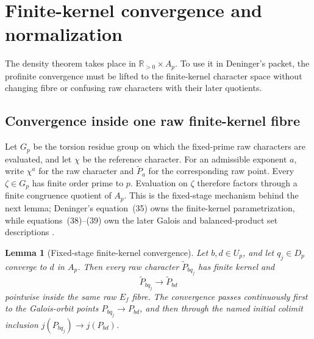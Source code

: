 \documentclass[11pt]{article}
\newtheorem{lemma}[theorem]{Lemma}
\theoremstyle{definition}
\newcommand{\R}{\mathbb{R}}
\begin{document}
\section{Finite-kernel convergence and normalization}\label{sec:finite}

The density theorem takes place in \(\R_{>0}\times A_p\).  To use it in Deninger's packet, the profinite convergence must be lifted to the finite-kernel character space without changing fibre or confusing raw characters with their later quotients.

\subsection{Convergence inside one raw finite-kernel fibre}

Let \(G_p\) be the torsion residue group on which the fixed-prime raw characters are evaluated, and let \(\chi\) be the reference character.  For an admissible exponent \(a\), write \(\chi^a\) for the raw character and \(\widetilde P_a\) for the corresponding raw point.  Every \(\zeta\in G_p\) has finite order prime to \(p\).  Evaluation on \(\zeta\) therefore factors through a finite congruence quotient of \(A_p\).  This is the fixed-stage mechanism behind the next lemma; Deninger's equation~(35) owns the finite-kernel parametrization, while equations~(38)--(39) own the later Galois and balanced-product set descriptions \cite[physical pp.~32--33, equations~(35), (38), and~(39)]{Deninger2026}.

\begin{lemma}[Fixed-stage finite-kernel convergence]\label{lem:character}
Let \(b,d\in U_p\), and let \(q_j\in D_p\) converge to \(d\) in \(A_p\).  Then every raw character \(\widetilde P_{bq_j}\) has finite kernel and
\[
 \widetilde P_{bq_j}\longrightarrow\widetilde P_{bd}
\]
pointwise inside the same raw \(E_f\) fibre.  The convergence passes continuously first to the Galois-orbit points \(P_{bq_j}\to P_{bd}\), and then through the named initial colimit inclusion \(j(P_{bq_j})\to j(P_{bd})\).
\end{lemma}
\end{document}

